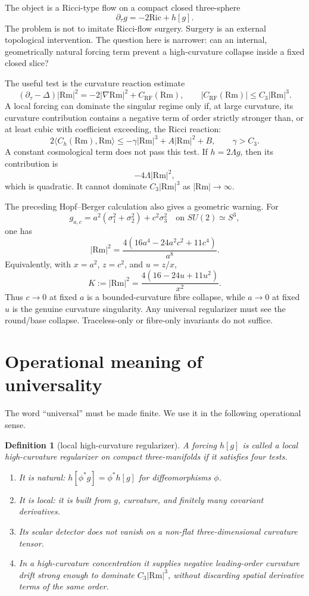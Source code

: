 \documentclass[11pt]{amsart}
\newtheorem{definition}{Definition}
\newcommand{\Rm}{\mathrm{Rm}}
\newcommand{\Ric}{\mathrm{Ric}}
\newcommand{\dt}{\partial_\tau}
\begin{document}
The object is a Ricci-type flow on a compact closed three-sphere
\[
        \dt g=-2\Ric+h[g].
\]
The problem is not to imitate Ricci-flow surgery.  Surgery is an external
topological intervention.  The question here is narrower: can an internal,
geometrically natural forcing term prevent a high-curvature collapse inside a
fixed closed slice?

The useful test is the curvature reaction estimate
\[
        (\dt-\Delta)|\Rm|^2
        =
        -2|\nabla\Rm|^2+C_{\mathrm{RF}}(\Rm),
        \qquad
        |C_{\mathrm{RF}}(\Rm)|\le C_3|\Rm|^3 .
\]
A local forcing can dominate the singular regime only if, at large curvature,
its curvature contribution contains a negative term of order strictly stronger
than, or at least cubic with coefficient exceeding, the Ricci reaction:
\[
        2\langle C_h(\Rm),\Rm\rangle
        \le
        -\gamma |\Rm|^3+A|\Rm|^2+B,
        \qquad
        \gamma>C_3.
\]
A constant cosmological term does not pass this test.  If \(h=2\Lambda g\),
then its contribution is
\[
        -4\Lambda |\Rm|^2,
\]
which is quadratic.  It cannot dominate \(C_3|\Rm|^3\) as
\(|\Rm|\to\infty\).

The preceding Hopf--Berger calculation also gives a geometric warning.  For
\[
        g_{a,c}=a^2(\sigma_1^2+\sigma_2^2)+c^2\sigma_3^2
        \quad \text{on } SU(2)\simeq S^3,
\]
one has
\[
        |\Rm|^2
        =
        \frac{4(16a^4-24a^2c^2+11c^4)}{a^8}.
\]
Equivalently, with \(x=a^2\), \(z=c^2\), and \(u=z/x\),
\[
        K:=|\Rm|^2
        =
        \frac{4(16-24u+11u^2)}{x^2}.
\]
Thus \(c\to0\) at fixed \(a\) is a bounded-curvature fibre collapse, while
\(a\to0\) at fixed \(u\) is the genuine curvature singularity.  Any universal
regularizer must see the round/base collapse.  Traceless-only or fibre-only
invariants do not suffice.

\section{Operational meaning of universality}

The word ``universal'' must be made finite.  We use it in the following
operational sense.

\begin{definition}[local high-curvature regularizer]
A forcing \(h[g]\) is called a local high-curvature regularizer on compact
three-manifolds if it satisfies four tests.

\begin{enumerate}[label=(\roman*)]
\item It is natural: \(h[\phi^*g]=\phi^*h[g]\) for diffeomorphisms \(\phi\).
\item It is local: it is built from \(g\), curvature, and finitely many
covariant derivatives.
\item Its scalar detector does not vanish on a non-flat three-dimensional
curvature tensor.
\item In a high-curvature concentration it supplies negative leading-order
curvature drift strong enough to dominate \(C_3|\Rm|^3\), without discarding
spatial derivative terms of the same order.
\end{enumerate}
\end{definition}
\end{document}
